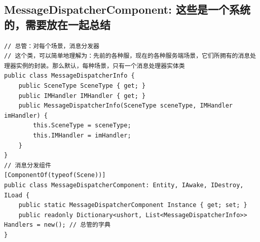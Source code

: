 \documentclass[9pt, b5paper]{article}
\begin{document}
\subsection{MessageDispatcherComponent: 这些是一个系统的，需要放在一起总结}
\label{sec:orgefb0673}
\begin{verbatim}
// 总管：对每个场景，消息分发器
// 这个类，可以简单地理解为：先前的各种服，现在的各种服务端场景，它们所拥有的消息处理器实例的封装。那么默认，每种场景，只有一个消息处理器实体类
public class MessageDispatcherInfo { 
    public SceneType SceneType { get; }
    public IMHandler IMHandler { get; }
    public MessageDispatcherInfo(SceneType sceneType, IMHandler imHandler) {
        this.SceneType = sceneType;
        this.IMHandler = imHandler;
    }
}
// 消息分发组件
[ComponentOf(typeof(Scene))]
public class MessageDispatcherComponent: Entity, IAwake, IDestroy, ILoad {
    public static MessageDispatcherComponent Instance { get; set; }
    public readonly Dictionary<ushort, List<MessageDispatcherInfo>> Handlers = new(); // 总管的字典
}
\end{verbatim}
\end{document}
